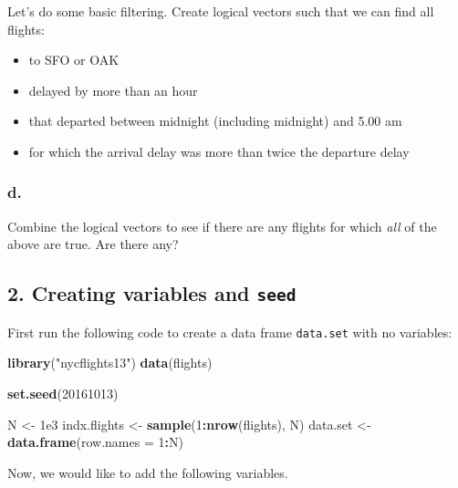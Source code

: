 \documentclass[]{article}
\newenvironment{Shaded}{\begin{snugshade}}{\end{snugshade}}
\newcommand{\DataTypeTok}[1]{\textcolor[rgb]{0.13,0.29,0.53}{#1}}
\newcommand{\DecValTok}[1]{\textcolor[rgb]{0.00,0.00,0.81}{#1}}
\newcommand{\FloatTok}[1]{\textcolor[rgb]{0.00,0.00,0.81}{#1}}
\newcommand{\KeywordTok}[1]{\textcolor[rgb]{0.13,0.29,0.53}{\textbf{#1}}}
\newcommand{\NormalTok}[1]{#1}
\newcommand{\OperatorTok}[1]{\textcolor[rgb]{0.81,0.36,0.00}{\textbf{#1}}}
\newcommand{\StringTok}[1]{\textcolor[rgb]{0.31,0.60,0.02}{#1}}
\providecommand{\tightlist}{%
  \setlength{\itemsep}{0pt}\setlength{\parskip}{0pt}}
\begin{document}
Let's do some basic filtering. Create logical vectors such that we can
find all flights:

\begin{itemize}
\tightlist
\item
  to SFO or OAK\\
\item
  delayed by more than an hour\\
\item
  that departed between midnight (including midnight) and 5.00 am\\
\item
  for which the arrival delay was more than twice the departure delay
\end{itemize}

\hypertarget{d.}{%
\subsubsection{d.}\label{d.}}

Combine the logical vectors to see if there are any flights for which
\emph{all} of the above are true. Are there any?

\hypertarget{creating-variables-and-seed}{%
\subsection{\texorpdfstring{2. Creating variables and
\texttt{seed}}{2. Creating variables and seed}}\label{creating-variables-and-seed}}

First run the following code to create a data frame \texttt{data.set}
with no variables:

\begin{Shaded}
\begin{Highlighting}[]
\KeywordTok{library}\NormalTok{(}\StringTok{"nycflights13"}\NormalTok{)}
\KeywordTok{data}\NormalTok{(flights)}

\KeywordTok{set.seed}\NormalTok{(}\DecValTok{20161013}\NormalTok{)}

\NormalTok{N <-}\StringTok{ }\FloatTok{1e3}
\NormalTok{indx.flights <-}\StringTok{ }\KeywordTok{sample}\NormalTok{(}\DecValTok{1}\OperatorTok{:}\KeywordTok{nrow}\NormalTok{(flights), N) }
\NormalTok{data.set <-}\StringTok{ }\KeywordTok{data.frame}\NormalTok{(}\DataTypeTok{row.names =} \DecValTok{1}\OperatorTok{:}\NormalTok{N)}
\end{Highlighting}
\end{Shaded}

Now, we would like to add the following variables.
\end{document}
